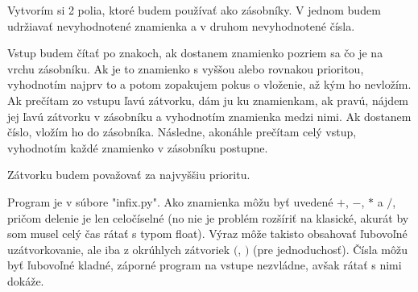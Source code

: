 
Vytvorím si 2 polia, ktoré budem používať ako zásobníky. V jednom budem 
udržiavať nevyhodnotené znamienka a v druhom nevyhodnotené čísla. 

Vstup budem čítať po znakoch, ak dostanem znamienko pozriem sa čo je 
na vrchu zásobníku. Ak je to znamienko s vyššou alebo rovnakou prioritou, 
vyhodnotím najprv to a potom zopakujem pokus o vloženie, až kým ho 
nevložím. Ak prečítam zo vstupu ľavú zátvorku, dám ju ku znamienkam, ak 
pravú, nájdem jej ľavú zátvorku v zásobníku a vyhodnotím znamienka medzi 
nimi. Ak dostanem číslo, vložím ho do zásobníka. Následne, akonáhle 
prečítam celý vstup, vyhodnotím každé znamienko v zásobníku postupne.

Zátvorku budem považovať za najvyššiu prioritu.

Program je v súbore "infix.py". Ako znamienka môžu byť uvedené $+$, $-$, 
$*$ a $/$, pričom delenie je len celočíselné (no nie je problém rozšíriť 
na klasické, akurát by som musel celý čas rátať s typom float). Výraz 
môže takisto obsahovať ľubovoľné uzátvorkovanie, ale iba z okrúhlych 
zátvoriek $($, $)$ (pre jednoduchosť). Čísla môžu byť ľubovoľné kladné, 
záporné program na vstupe nezvládne, avšak rátať s nimi dokáže.

